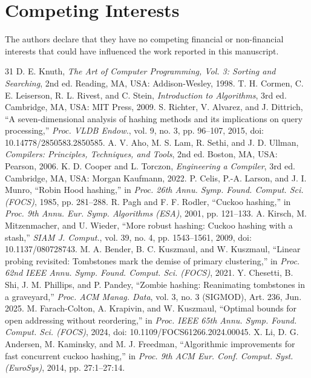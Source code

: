 \documentclass{ieeeaccess}
\begin{document}
\section*{Competing Interests}
The authors declare that they have no competing financial or non-financial interests that could have influenced the work reported in this manuscript.

\begin{thebibliography}{31}
 D. E. Knuth, \emph{The Art of Computer Programming, Vol. 3: Sorting and Searching}, 2nd ed. Reading, MA, USA: Addison-Wesley, 1998.
 T. H. Cormen, C. E. Leiserson, R. L. Rivest, and C. Stein, \emph{Introduction to Algorithms}, 3rd ed. Cambridge, MA, USA: MIT Press, 2009.
 S. Richter, V. Alvarez, and J. Dittrich, ``A seven-dimensional analysis of hashing methods and its implications on query processing,'' \emph{Proc. VLDB Endow.}, vol. 9, no. 3, pp. 96--107, 2015, doi: 10.14778/2850583.2850585.
 A. V. Aho, M. S. Lam, R. Sethi, and J. D. Ullman, \emph{Compilers: Principles, Techniques, and Tools}, 2nd ed. Boston, MA, USA: Pearson, 2006.
 K. D. Cooper and L. Torczon, \emph{Engineering a Compiler}, 3rd ed. Cambridge, MA, USA: Morgan Kaufmann, 2022.
 P. Celis, P.-A. Larson, and J. I. Munro, ``Robin Hood hashing,'' in \emph{Proc. 26th Annu. Symp. Found. Comput. Sci. (FOCS)}, 1985, pp. 281--288.
 R. Pagh and F. F. Rodler, ``Cuckoo hashing,'' in \emph{Proc. 9th Annu. Eur. Symp. Algorithms (ESA)}, 2001, pp. 121--133.
 A. Kirsch, M. Mitzenmacher, and U. Wieder, ``More robust hashing: Cuckoo hashing with a stash,'' \emph{SIAM J. Comput.}, vol. 39, no. 4, pp. 1543--1561, 2009, doi: 10.1137/080728743.
 M. A. Bender, B. C. Kuszmaul, and W. Kuszmaul, ``Linear probing revisited: Tombstones mark the demise of primary clustering,'' in \emph{Proc. 62nd IEEE Annu. Symp. Found. Comput. Sci. (FOCS)}, 2021.
 Y. Chesetti, B. Shi, J. M. Phillips, and P. Pandey, ``Zombie hashing: Reanimating tombstones in a graveyard,'' \emph{Proc. ACM Manag. Data}, vol. 3, no. 3 (SIGMOD), Art. 236, Jun. 2025.
 M. Farach-Colton, A. Krapivin, and W. Kuszmaul, ``Optimal bounds for open addressing without reordering,'' in \emph{Proc. IEEE 65th Annu. Symp. Found. Comput. Sci. (FOCS)}, 2024, doi: 10.1109/FOCS61266.2024.00045.
 X. Li, D. G. Andersen, M. Kaminsky, and M. J. Freedman, ``Algorithmic improvements for fast concurrent cuckoo hashing,'' in \emph{Proc. 9th ACM Eur. Conf. Comput. Syst. (EuroSys)}, 2014, pp. 27:1--27:14.

\end{thebibliography}
\end{document}

